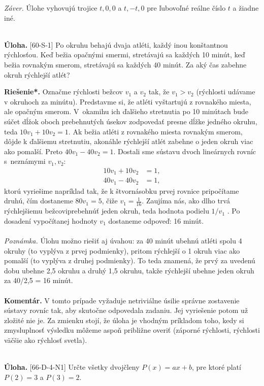 \documentclass[11pt,a4paper,oneside,final]{book}
\newcommand{\kom}{\textbf{Komentár.} }
\newcommand{\ul}{\textbf{Úloha.} }
\newcommand{\rieh}{\textbf{Riešenie*.} }
\begin{document}
\textit{Záver.} Úlohe vyhovujú trojice $t, 0, 0$ a $t, -t, 0$ pre ľubovoľné reálne číslo $t$ a žiadne iné.\\
\\
\begin{tcolorbox}[breakable,notitle,boxrule=0pt,colback=light-gray,colframe=light-gray]\ul [60-S-1]
Po okruhu behajú dvaja atléti, každý inou konštantnou rýchlosťou. Keď bežia opačnými smermi, stretávajú sa každých 10 minút, keď bežia rovnakým smerom, stretávajú sa každých 40 minút. Za aký čas zabehne okruh rýchlejší atlét?

\end{tcolorbox}

\rieh Označme rýchlosti bežcov $v_1$ a $v_2$ tak, že $v_1 > v_2$ (rýchlosti udávame v okruhoch za minútu). Predstavme si, že atléti vyštartujú z rovnakého miesta, ale opačným smerom. V~okamihu ich ďalšieho stretnutia po 10 minútach bude súčet dĺžok oboch prebehnutých úsekov zodpovedať presne dĺžke jedného okruhu, teda
$10v_1 +10v_2= 1$.
Ak bežia atléti z rovnakého miesta rovnakým smerom, dôjde k ďalšiemu stretnutiu, akonáhle rýchlejší atlét zabehne o jeden okruh viac ako pomalší. Preto $40v_1 -40v_2 = 1$.
Dostali sme sústavu dvoch lineárnych rovníc s~neznámymi $v_1 , v_2$:
\begin{align*}
10v_1 + 10v_2 &= 1,\\
40v_1 - 40v_2 &= 1,
\end{align*}
ktorú vyriešime napríklad tak, že k štvornásobku prvej rovnice pripočítame druhú, čím dostaneme $80v_1 = 5$, čiže $v_1 =\frac{1}{16}$. Zaujíma nás, ako dlho trvá rýchlejšiemu bežcoviprebehnúť jeden okruh, teda hodnota podielu $1/v_1$ . Po dosadení vypočítanej hodnoty $v_1$ dostaneme odpoveď: 16 minút.\\
\\
\textit{Poznámka.} Úlohu možno riešiť aj úvahou: za 40 minút ubehnú atléti spolu 4 okruhy (to vyplýva z prvej podmienky), pritom rýchlejší o 1 okruh viac ako pomalší (to vyplýva z druhej podmienky). To teda znamená, že prvý za uvedenú dobu ubehne 2,5 okruhu a druhý 1,5 okruhu, takže rýchlejší ubehne jeden okruh za 40/2,5 = 16 minút.\\
\\
\kom V tomto prípade vyžaduje netriviálne úsilie správne zostavenie sústavy rovníc tak, aby skutočne odpovedala zadaniu. Jej vyriešenie potom už zložité nie je. Za zmienku stojí, že úloha je vhodným príkladom toho, kedy si zmysluplnosť výsledku môžeme aspoň približne overiť (záporné rýchlosti, rýchlosti väčšie ako rýchlosť svetla).\\
\\
\begin{tcolorbox}[breakable,notitle,boxrule=0pt,colback=light-gray,colframe=light-gray]\ul [66-D-4-N1] Určte všetky dvojčleny $P (x) = ax + b$, pre ktoré platí $P(2) = 3$ a $P (3) = 2$.

\end{tcolorbox}
\end{document}
